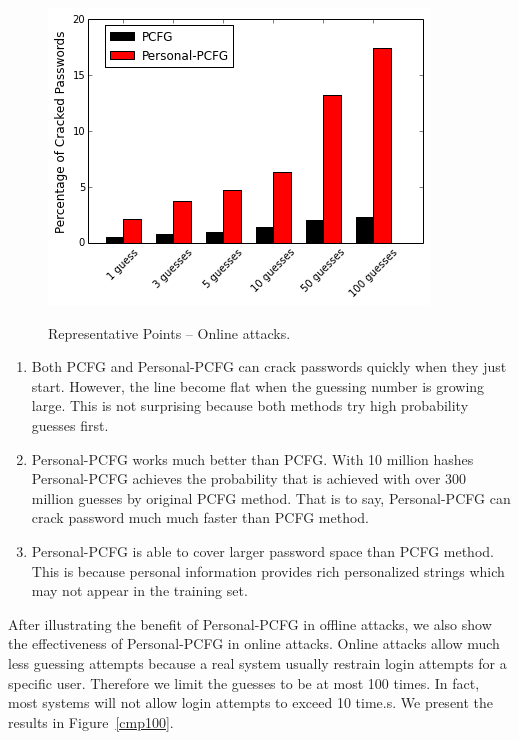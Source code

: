 \begin{figure}[h!]
\begin{minipage}{.33\textwidth}
\end{minipage}%
\begin{minipage}{.33\textwidth}
  \captionsetup{font=scriptsize}
  \centering
  \caption{Representative Points -- Online attacks.}{}
  \label{points}
  \includegraphics[width=.9\linewidth]{fig/online}
\end{minipage}
\end{figure}



\begin{enumerate}[leftmargin=*]
\item Both PCFG and Personal-PCFG can crack passwords quickly when they just start. However, the line become flat when the guessing number is growing large. This is not surprising because both methods try high probability guesses first. 

\item Personal-PCFG works much better than PCFG. With 10 million hashes Personal-PCFG achieves the probability that is achieved with over 300 million guesses by original PCFG method. That is to say, Personal-PCFG can crack password much much faster than PCFG method. 

\item Personal-PCFG is able to cover larger password space than PCFG method. This is because personal information provides rich personalized strings which may not appear in the training set.

\end{enumerate}

After illustrating the benefit of Personal-PCFG in offline attacks, we also show the effectiveness of Personal-PCFG in online attacks. Online attacks allow much less guessing attempts because a real system usually restrain login attempts for a specific user. Therefore we limit the guesses to be at most 100 times. In fact, most systems will not allow login attempts to exceed 10 time.s. We present the results in Figure~\ref{cmp100}.


